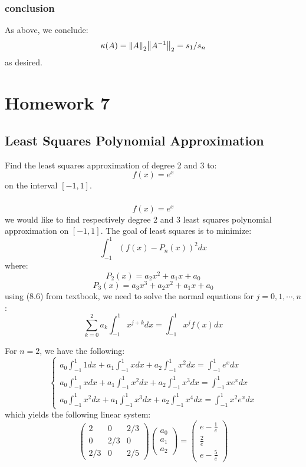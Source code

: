 \documentclass[12pt]{article} %
\newcommand{\ka}{\kappa}
\newcommand{\1}[1]{\mathds{1}\left[#1\right]}
\begin{document}
\subsubsection{conclusion}
As above, we conclude:
$$
	\ka(A) = \norm{A}_2\norm{A^{-1}}_2 = s_1/s_n
$$ as desired.


\newpage
\section{Homework 7}
\subsection{Least Squares Polynomial Approximation}
Find the least squares approximation of degree 2 and 3 to:
$$
	f(x) = e^x
$$ on the interval $[-1,1]$.
\subsubsection{}
$$
	f(x) = e^x
$$ we would like to find respectively degree 2 and 3 least squares polynomial approximation on $[-1,1]$. The goal of least squares is to minimize:
$$
	\int_{-1}^1 (f(x) - P_n(x))^2dx
$$ where:
$$
	P_2(x) =a_2x^2 + a_1x+a_0
$$
$$
	P_3(x) = a_3x^3 + a_2x^2 + a_1x + a_0
$$ using (8.6) from textbook, we need to solve the normal equations for $j = 0,1,\cdots, n$:
$$
	\sum_{k=0}^2a_k\int_{-1}^{1}x^{j+k}dx = \int_{-1}^1x^jf(x)dx
$$

For $n=2$, we have the following:
$$
\begin{cases}
		a_0\int_{-1}^1 1dx +a_1\int_{-1}^1xdx + a_2\int_{-1}^1x^2dx= \int_{-1}^1e^xdx\\
		a_0\int_{-1}^1 xdx +a_1\int_{-1}^1x^2dx + a_2\int_{-1}^1x^3dx= \int_{-1}^1xe^xdx\\
		a_0\int_{-1}^1 x^2dx +a_1\int_{-1}^1x^3dx + a_2\int_{-1}^1x^4dx= \int_{-1}^1x^2e^xdx
\end{cases}
$$ which yields the following linear system:
$$
	\begin{pmatrix}
	2 & 0 & 2/3 \\
	0 & 2/3 & 0\\
	2/3 & 0 & 2/5
	\end{pmatrix}
	\begin{pmatrix}
	a_0\\
	a_1\\
	a_2
	\end{pmatrix}=
	\begin{pmatrix}
	e-\frac1e\\
	\frac2e\\
	e-\frac5e
	\end{pmatrix}
$$
\end{document}
